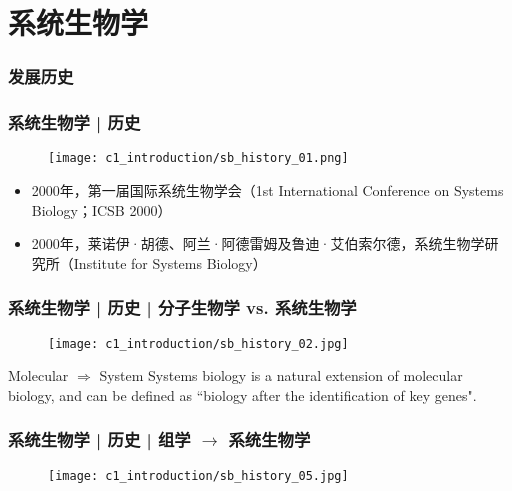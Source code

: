 \section{系统生物学}
\subsubsection{发展历史}
\begin{frame}
  \frametitle{系统生物学 | 历史}
  \begin{figure}
    \centering
    \texttt{[image: c1\_introduction/sb\_history\_01.png]}
  \end{figure}
  \vspace{-1em}
    \begin{itemize}
    \item 2000年，第一届国际系统生物学会（1st International Conference on Systems Biology；ICSB 2000）
    \item 2000年，莱诺伊·胡德、阿兰·阿德雷姆及鲁迪·艾伯索尔德，系统生物学研究所（Institute for Systems Biology）
  \end{itemize}
\end{frame}

\begin{frame}
  \frametitle{系统生物学 | 历史 | 分子生物学 vs. 系统生物学}
  \begin{figure}
    \centering
    \texttt{[image: c1\_introduction/sb\_history\_02.jpg]}
  \end{figure}
  \vspace{-0.8em}
    \begin{block}{Molecular $\Rightarrow$ System}
  Systems biology is a natural extension of molecular biology, and can be defined as ``biology after the identification of key genes".
  \end{block}
\end{frame}

\begin{frame}
  \frametitle{系统生物学 | 历史 | 组学 $\rightarrow$ 系统生物学}
  \begin{figure}
    \centering
    \texttt{[image: c1\_introduction/sb\_history\_05.jpg]}
  \end{figure}
\end{frame}

